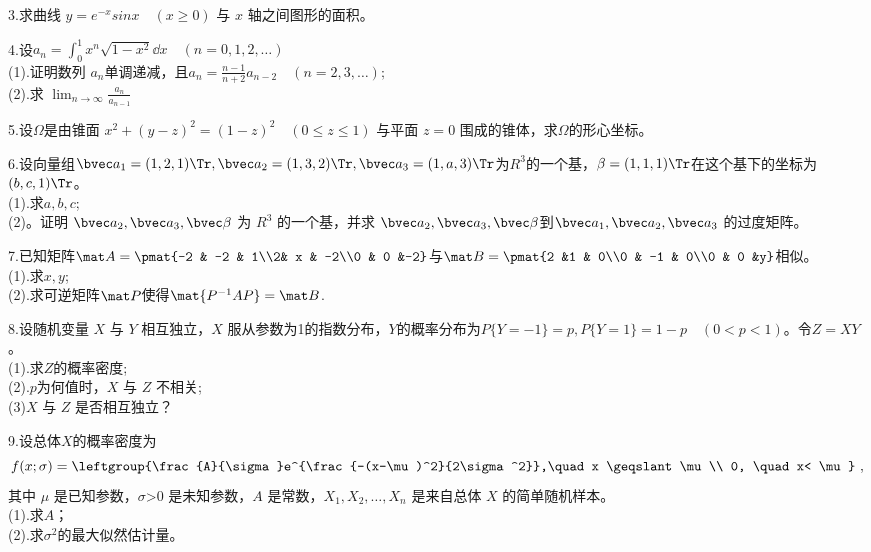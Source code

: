 3.求曲线 $y=e^{-x}sinx \quad (x\geqslant 0)$ 与 $x$ 轴之间图形的面积。

4.设$a_n=\int_0^1 x^n \sqrt{1-x^2}\dd{x}\quad (n=0,1,2,\dots)$\\
(1).证明数列 ${a_n}$单调递减，且$\displaystyle a_n=\frac{n-1}{n+2}a_{n-2}\quad (n=2,3,\dots);$\\
(2).求 $\displaystyle \lim_{n \to \infty}\frac{a_n}{a_{n-1}}$

5.设$\Omega$是由锥面 $x^2+(y-z)^2=(1-z)^2 \quad (0\leqslant z \leqslant 1)$ 与平面 $z=0$ 围成的锥体，求$\Omega$的形心坐标。

6.设向量组$\bvec a_1=(1,2,1) \Tr,\bvec a_2=(1,3,2) \Tr,\bvec a_3=(1,a,3) \Tr$为$R^3$的一个基，$\beta=(1,1,1)\Tr$在这个基下的坐标为$(b,c,1) \Tr$。\\
(1).求$a,b,c$;\\
(2)。证明 $\bvec a_2,\bvec a_3,\bvec \beta$ 为 $R^3$ 的一个基，并求 $\bvec a_2,\bvec a_3,\bvec \beta$到$\bvec a_1,\bvec a_2,\bvec a_3$ 的过度矩阵。

7.已知矩阵$\mat A=\pmat{-2 & -2 & 1\\2& x & -2\\0 & 0 &-2}$与$\mat B=\pmat{2 &1 & 0\\0 & -1 & 0\\0 & 0 &y}$相似。\\
(1).求$x,y$;\\
(2).求可逆矩阵$\mat P$使得$\mat{P^{-1}AP}=\mat B$.

8.设随机变量 $X$ 与 $Y$ 相互独立，$X$ 服从参数为1的指数分布，$Y$的概率分布为$P\{Y=-1\}=p,P\{Y=1\}=1-p \quad (0<p<1)$。令$Z=XY$。\\
(1).求$Z$的概率密度;\\
(2).$p$为何值时，$X$ 与 $Z$ 不相关;\\
(3)$X$ 与 $Z$ 是否相互独立？

9.设总体$X$的概率密度为
$$
f(x;\sigma)=\leftgroup{\frac{A}{\sigma}e^{\frac{-(x-\mu)^2}{2\sigma^2}},\quad  x \geqslant \mu\\ 0, \quad  x< \mu}~,
$$
其中 $\mu$ 是已知参数，$\sigma$>0 是未知参数，$A$ 是常数，$X_1,X_2,\dots,X_n$ 是来自总体 $X$ 的简单随机样本。\\
(1).求$A$；\\
(2).求$\sigma^2$的最大似然估计量。

